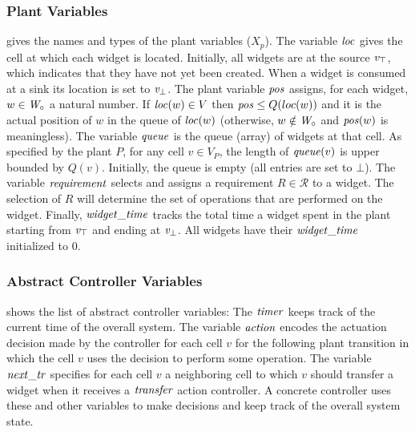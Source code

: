 \subsubsection*{Plant Variables}
 gives the names and types of the plant variables ($X_p$).
The  variable $\mathit{loc}$ gives the  cell at which each widget is located. Initially, all widgets are at the source $\mathit{v}_\top$, which indicates that they have not yet been created. When a widget is consumed at a sink its location is set to $\mathit{v}_\bot$. 
%
The plant variable $\mathit{pos}$ assigns, for each widget, $w \in \mathit{W}_\circ$ a natural number. If $\mathit{loc}(w) \in V$ then $\mathit{pos} \leq Q(loc(w))$ and it is the actual position of $w$ in the queue of $\mathit{loc}(w)$ (otherwise, $w \notin \mathit{W}_\circ$ and $\mathit{pos}(w)$ is meaningless).
%
The variable $\mathit{queue}$ is the queue (array) of widgets at that cell. As specified by the plant $P$, for any cell $v \in V_P$, the length of $\mathit{queue}(v)$ is upper bounded by $Q(v)$. Initially, the queue is empty (\ie all entries are set to $\bot$).
%
The variable $\mathit{requirement}$ selects and assigns a requirement $R \in \mathcal{R}$ to a widget. The selection of $R$ will determine the set of operations that are performed on the widget. 
%
Finally, $\mathit{widget\_time}$ tracks the total time a widget spent in the plant starting from $\mathit{v}_\top$ and ending at $\mathit{v}_\bot$. All widgets have their $\mathit{widget\_time}$ initialized to 0.

\begin{figure}[!ht]
	\centering
\end{figure}

\subsubsection*{Abstract Controller Variables}
 shows the list of abstract controller variables:
The $\mathit{timer}$ keeps track of the current time of the  overall system.
%
The variable $\mathit{action}$ encodes the actuation decision made by the controller for each cell $v$ for the following plant transition in which the cell $v$ uses the decision to perform some operation.
%
The variable $\mathit{next\_tr}$ specifies for each cell $v$ a neighboring cell   to which $v$ should transfer a widget  when it receives a  $\mathit{transfer}$ action controller.
%
A concrete controller uses these and other variables to make decisions and keep track of the overall system state. 

